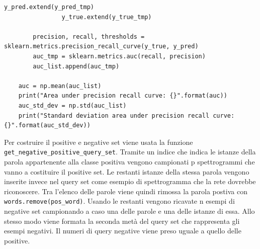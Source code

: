 \documentclass[12pt,a4paper,titlepage]{article}
\begin{document}
\begin{lstlisting}[language=iPython,firstnumber=77, caption=protonet\_test.py, label=protonet_test,captionpos=b]
                y_pred.extend(y_pred_tmp)
                y_true.extend(y_true_tmp)

        precision, recall, thresholds = sklearn.metrics.precision_recall_curve(y_true, y_pred)
        auc_tmp = sklearn.metrics.auc(recall, precision)
        auc_list.append(auc_tmp)
        
    auc = np.mean(auc_list)
    print("Area under precision recall curve: {}".format(auc))
    auc_std_dev = np.std(auc_list)
    print("Standard deviation area under precision recall curve: {}".format(auc_std_dev))
\end{lstlisting}

Per costruire il positive e negative set viene usata la funzione \texttt{get\_negative\_positive\_query\_set}.
Tramite un indice che indica le istanze della parola appartenente alla classe positiva vengono campionati p spettrogrammi che vanno a costituire il positive set. Le restanti istanze della stessa parola vengono inserite invece nel query set come esempio di spettrogramma che la rete dovrebbe riconoscere.
Tra l'elenco delle parole viene quindi rimossa la parola postiva con \texttt{words.remove(pos\_word)}.
Usando le restanti vengono ricavate n esempi di negative set campionando a caso una delle parole e una delle istanze di essa.
Allo stesso modo viene formata la seconda metà del query set che rappresenta gli esempi negativi. Il numeri di query negative viene preso uguale a quello delle positive.
\end{document}
